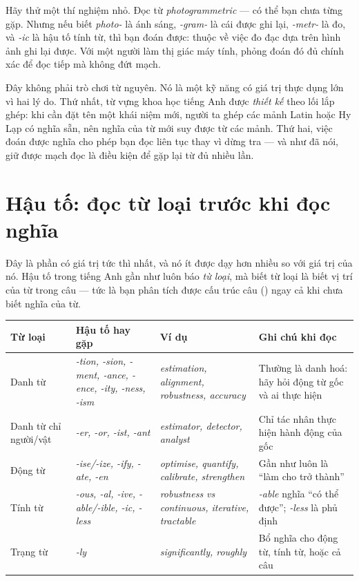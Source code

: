 \documentclass[../../english.tex]{subfiles}
\begin{document}
Hãy thử một thí nghiệm nhỏ. Đọc từ \emph{photogrammetric} --- có thể bạn chưa từng gặp. Nhưng nếu biết \emph{photo-} là ánh sáng, \emph{-gram-} là cái được ghi lại, \emph{-metr-} là đo, và \emph{-ic} là hậu tố tính từ, thì bạn đoán được: thuộc về việc đo đạc dựa trên hình ảnh ghi lại được. Với một người làm thị giác máy tính, phỏng đoán đó đủ chính xác để đọc tiếp mà không đứt mạch.

Đây không phải trò chơi từ nguyên. Nó là một kỹ năng có giá trị thực dụng lớn vì hai lý do. Thứ nhất, từ vựng khoa học tiếng Anh được \emph{thiết kế} theo lối lắp ghép: khi cần đặt tên một khái niệm mới, người ta ghép các mảnh Latin hoặc Hy Lạp có nghĩa sẵn, nên nghĩa của từ mới suy được từ các mảnh. Thứ hai, việc đoán được nghĩa cho phép bạn đọc liên tục thay vì dừng tra --- và như  đã nói, giữ được mạch đọc là điều kiện để gặp lại từ đủ nhiều lần.

\section{Hậu tố: đọc từ loại trước khi đọc nghĩa}

Đây là phần có giá trị tức thì nhất, và nó ít được dạy hơn nhiều so với giá trị của nó. Hậu tố trong tiếng Anh gần như luôn báo \emph{từ loại}, mà biết từ loại là biết vị trí của từ trong câu --- tức là bạn phân tích được cấu trúc câu () ngay cả khi chưa biết nghĩa của từ.

\begin{center}\footnotesize
\begin{tabularx}{\linewidth}{@{}L{2.4cm}L{3.0cm}L{4.2cm}Y@{}}
\toprule
\textbf{Từ loại} & \textbf{Hậu tố hay gặp} & \textbf{Ví dụ} & \textbf{Ghi chú khi đọc}\\
\midrule
Danh từ & \emph{-tion, -sion, -ment, -ance, -ence, -ity, -ness, -ism} & \emph{estimation, alignment, robustness, accuracy} & Thường là danh hoá: hãy hỏi động từ gốc và ai thực hiện\\
Danh từ chỉ người/vật & \emph{-er, -or, -ist, -ant} & \emph{estimator, detector, analyst} & Chỉ tác nhân thực hiện hành động của gốc\\
Động từ & \emph{-ise/-ize, -ify, -ate, -en} & \emph{optimise, quantify, calibrate, strengthen} & Gần như luôn là ``làm cho trở thành''\\
Tính từ & \emph{-ous, -al, -ive, -able/-ible, -ic, -less} & \emph{robust\emph{ness} vs \emph{continuous}, iterative, tractable} & \emph{-able} nghĩa ``có thể được''; \emph{-less} là phủ định\\
Trạng từ & \emph{-ly} & \emph{significantly, roughly} & Bổ nghĩa cho động từ, tính từ, hoặc cả câu\\
\bottomrule
\end{tabularx}
\end{center}
\end{document}
